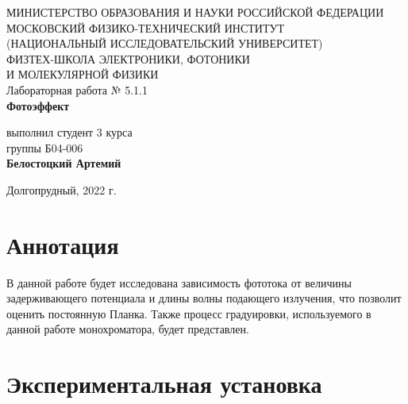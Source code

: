 \documentclass[a4paper,12pt]{article}
\begin{document}
 

\begin{titlepage}
	\begin{center}
		\large 	МИНИСТЕРСТВО ОБРАЗОВАНИЯ И НАУКИ РОССИЙСКОЙ ФЕДЕРАЦИИ\\
				МОСКОВСКИЙ ФИЗИКО-ТЕХНИЧЕСКИЙ ИНСТИТУТ \\
				(НАЦИОНАЛЬНЫЙ ИССЛЕДОВАТЕЛЬСКИЙ УНИВЕРСИТЕТ)\\ 
				ФИЗТЕХ-ШКОЛА ЭЛЕКТРОНИКИ, ФОТОНИКИ \\
				И МОЛЕКУЛЯРНОЙ ФИЗИКИ \\
		
		
		\vspace{4.0 cm}
		Лабораторная работа № 5.1.1 \\ 
		\LARGE \textbf{Фотоэффект}
	\end{center}
	\vspace{3 cm} \large
	
	\begin{flushright}
		выполнил студент 3 курса \\
		{группы Б04-006}\\
		\textbf{Белостоцкий Артемий}\\
	\end{flushright}
	
	\vfill

	\begin{center}
	Долгопрудный, 2022 г.
	\end{center}
\end{titlepage}                                                                      

\section*{Аннотация}
В данной работе будет исследована зависимость фототока от величины задерживающего потенциала и длины волны подающего излучения, что позволит оценить постоянную Планка. Также процесс градуировки, используемого в данной работе монохроматора, будет представлен.	 

\section*{Экспериментальная установка}
\end{document}
